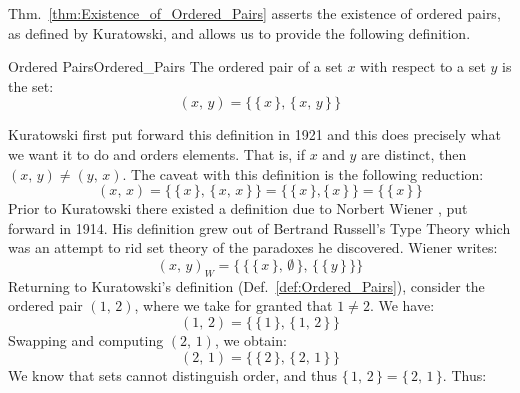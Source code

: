         Thm.~\ref{thm:Existence_of_Ordered_Pairs} asserts the existence of
        ordered pairs, as defined by Kuratowski, and allows
        us to provide the following definition.
        \begin{fdefinition}{Ordered Pairs}{Ordered_Pairs}
            The \gls{ordered pair} of a \gls{set} $x$ with respect to a set
            $y$ is the set:
            \begin{equation*}
                (x,\,y)=\big\{\,\{\,x\,\},\,\{\,x,\,y\,\}\,\big\}
            \end{equation*}
        \end{fdefinition}
        Kuratowski first put forward this definition
        in 1921 and this does precisely what we want it to do and orders
        elements. That is, if $x$ and $y$ are distinct, then
        $(x,\,y)\ne(y,\,x)$. The caveat with this definition is the following
        reduction:
        \begin{equation}
            (x,\,x)
            =\big\{\,\{\,x\,\},\,\{\,x,\,x\,\}\,\big\}
            =\big\{\,\{\,x\,\},\{\,x\,\}\,\big\}
            =\big\{\,\{\,x\,\}\,\big\}
        \end{equation}
        Prior to Kuratowski there existed a definition due to Norbert Wiener%
        , put forward in 1914. His definition grew out of
        Bertrand Russell's Type
        Theory which was an attempt to rid set theory of the
        paradoxes he discovered. Wiener writes:
        \begin{equation}
            (x,\,y)_{W}=\Big\{\,\big\{\,\{\,x\,\},\,\emptyset\,\big\},\,
                                \big\{\,\{\,y\,\}\,\big\}\Big\}
        \end{equation}
        Returning to Kuratowski's definition (Def.~\ref{def:Ordered_Pairs}),
        consider the ordered pair $(1,\,2)$, where we take for granted that
        $1\ne{2}$. We have:
        \begin{equation}
            (1,\,2)=\big\{\,\{\,1\,\},\,\{\,1,\,2\,\}\,\big\}
        \end{equation}
        Swapping and computing $(2,\,1)$, we obtain:
        \begin{equation}
            (2,\,1)=\big\{\,\{\,2\,\},\,\{\,2,\,1\,\}\,\big\}
        \end{equation}
        We know that sets cannot distinguish order, and thus
        $\{\,1,\,2\,\}=\{\,2,\,1\,\}$. Thus:
